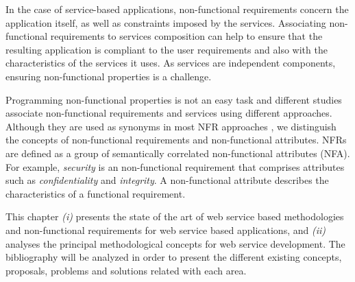 


In the case of service-based applications, non-functional requirements concern
the application itself, as well as constraints imposed by the services. 
Associating non-functional requirements to services composition can help to
ensure that the resulting application is compliant to the user requirements and
also with the characteristics of the services it uses. As services are
independent components, ensuring non-functional properties is a challenge.   

  
%  
 Programming non-functional properties is not an easy task and different studies
\cite{Babamir2010,AgarwalLS09,CholletL09,GutierrezRF10,XiaoCZBOLH08,JeongCL09,TsadimasNA12,MairizaZN10}
 associate non-functional requirements and services using
different approaches. Although they are used as synonyms in most NFR approaches
\cite{MairizaZN10}, we distinguish the concepts of non-functional requirements and non-functional attributes.
 NFRs are defined as a group of semantically correlated
 non-functional attributes (NFA). For example, \textit{security} is an
 non-functional requirement that comprises attributes such as
 \textit{confidentiality} and \textit{integrity}. A non-functional
 attribute describes the characteristics of a functional requirement. 
 
 This chapter \textit{(i)} presents the state of the art
 of web service based methodologies and non-functional requirements for web
 service based applications, and \textit{(ii)} analyses the principal
 methodological concepts for web service development. The bibliography will be
 analyzed in order to present the different existing concepts, proposals,
 problems and solutions related with each area.
 
